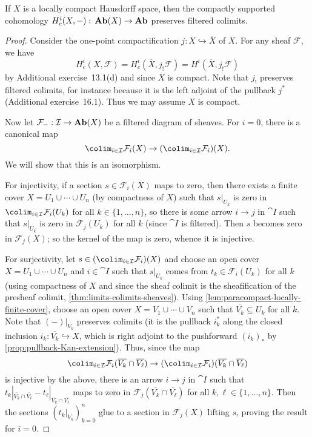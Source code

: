 \begin{lem}
If \(X\) is a locally compact Hausdorff space, then the compactly supported cohomology \(H^i_c(X,-)\colon\catAbelianSheaf(X)\to\catAbelianGroup\) preserves filtered colimits.
\end{lem}
\begin{proof}
Consider the one-point compactification \(j\colon X\hookrightarrow\overline{X}\) of \(X\).
For any sheaf \(\mathcal F\), we have
\[ H^i_c(X,\mathcal F) = H^i_c(\overline{X},j_!\mathcal F) = H^i(\overline{X},j_!\mathcal F) \]
by Additional exercise~13.1(d) and since \(\overline{X}\) is compact.
Note that \(j_!\) preserves filtered colimits, for instance because it is the left adjoint of the pullback \(j^*\) (Additional exercise~16.1).
Thus we may assume \(X\) is compact.

Now let \(\mathcal F_{-}\colon\cat I\to\catAbelianSheaf(X)\) be a filtered diagram of sheaves.
For \(i=0\), there is a canonical map
\[ \colim_{i\in\cat I}\mathcal F_i(X) \to (\colim_{i\in\cat I}\mathcal F_i)(X)\text{.} \]
We will show that this is an isomorphism.

For injectivity, if a section \(s\in\mathcal F_i(X)\) maps to zero, then there exists a finite cover \(X=U_1\cup\cdots\cup U_n\) (by compactness of \(X\)) such that \(s|_{U_k}\) is zero in \(\colim_{i\in\cat I}\mathcal F_i(U_k)\) for all \(k\in\{1,\ldots,n\}\), so there is some arrow \(i\to j\) in \(\cat I\) such that \(s|_{U_k}\) is zero in \(\mathcal F_j(U_k)\) for all \(k\) (since \(\cat I\) is filtered).
Then \(s\) becomes zero in \(\mathcal F_j(X)\); so the kernel of the map is zero, whence it is injective.

For surjectivity, let \(s\in(\colim_{i\in\cat I}\mathcal F_i)(X)\) and choose an open cover \(X=U_1\cup\cdots\cup U_n\) and \(i\in\cat I\) such that \(s|_{U_k}\) comes from \(t_k\in\mathcal F_i(U_k)\) for all \(k\) (using compactness of \(X\) and since the sheaf colimit is the sheafification of the presheaf colimit, \cref{thm:limits-colimits-sheaves}).
Using \cref{lem:paracompact-locally-finite-cover}, choose an open cover \(X=V_1\cup\cdots\cup V_n\) such that \(\overline{V_k}\subseteq U_k\) for all \(k\).
Note that \((-)|_{\overline{V_k}}\) preserves colimits (it is the pullback \(i_k^*\) along the closed inclusion \(i_k\colon\overline{V_k}\hookrightarrow X\), which is right adjoint to the pushforward \((i_k)_*\) by \cref{prop:pullback-Kan-extension}).
Thus, since the map
\[ \colim_{i\in\cat I}\mathcal F_i(\overline{V_k}\cap\overline{V_\ell}) \to (\colim_{i\in\cat I}\mathcal F_i)(\overline{V_k}\cap\overline{V_\ell}) \]
is injective by the above, there is an arrow \(i\to j\) in \(\cat I\) such that \(t_k|_{\overline{V_k}\cap\overline{V_\ell}}-t_\ell|_{\overline{V_k}\cap\overline{V_\ell}}\) maps to zero in \(\mathcal F_j(\overline{V_k}\cap\overline{V_\ell})\) for all \(k,\ell\in\{1,\ldots,n\}\).
Then the sections \((t_k|_{V_k})_{k=0}^n\) glue to a section in \(\mathcal F_j(X)\) lifting \(s\), proving the result for \(i=0\).


\end{proof}
